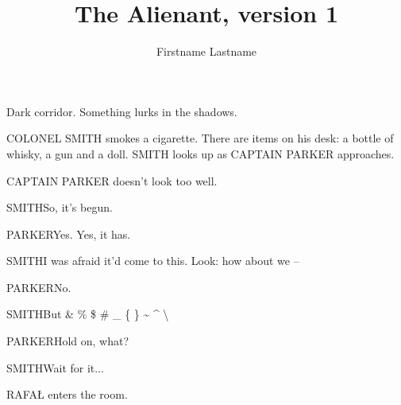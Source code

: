 \documentclass{screenplay}
\title{The Alienant, version 1}
\author{Firstname Lastname}
\begin{document}
\coverpage
\fadein
{}

Dark corridor. Something lurks in the shadows.


COLONEL SMITH smokes a cigarette. There are items on his desk: a bottle of whisky, a gun and a doll. SMITH looks up as CAPTAIN PARKER approaches.

CAPTAIN PARKER doesn't look too well.

\begin{dialogue}{SMITH}So, it's begun.\end{dialogue}

\begin{dialogue}{PARKER}Yes.  Yes, it has.\end{dialogue}

\begin{dialogue}{SMITH}I was afraid it'd come to this. Look: how about we –\end{dialogue}

\begin{dialogue}{PARKER}No.\end{dialogue}

\begin{dialogue}{SMITH}But \& \% \$ \# \_ \{ \} \textasciitilde{} \textasciicircum{} \textbackslash\end{dialogue}

\begin{dialogue}{PARKER}Hold on, what?\end{dialogue}

\begin{dialogue}{SMITH}Wait for it...\end{dialogue}

RAFAŁ enters the room.

\fadeout
\theend
\end{document}
